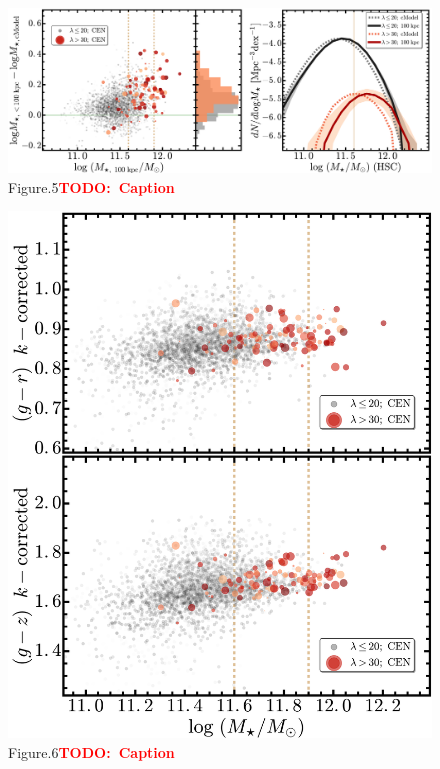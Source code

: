 \documentclass[preprint]{aastex}
\newcommand{\todo}[1]{\textcolor{red}{\textbf{TODO:~#1}}}
\begin{document}
\begin{CJK*}{UTF8}{gbsn}
\clearpage
{}
\begin{figure}
    \centering 
    \includegraphics[width=18.5cm]{fig/redbcg_lf_smf}
    \caption{Figure.5\todo{Caption}}\label{figure:5}
\end{figure}

\clearpage
{}
\begin{figure}
    \centering 
    \includegraphics[width=12.5cm]{fig/redbcg_mass_color}
    \caption{Figure.6\todo{Caption}}\label{figure:6}
\end{figure}


\end{CJK*}
\end{document}
